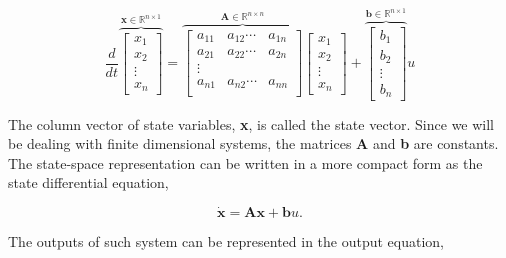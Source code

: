 \begin{displaymath}
\frac{d}{dt}\overbrace{\left[ \begin{array}{c}
                    x_{1}\\
                    x_{2}\\
                    \vdots\\
                    x_{n}
                    \end{array}\right]}^{\textbf{x}\in\mathbb{R}^{n\times1}}=
            \overbrace{\left[\begin{array}{ccc}
                    a_{11}&a_{12}\cdots&a_{1n}\\
                    a_{21}&a_{22}\cdots&a_{2n}\\
                    \vdots\\
                    a_{n1}&a_{n2}\cdots&a_{nn}\\
                    \end{array}\right]}^{\textbf{A}\in\mathbb{R}^{n\times n}}
            \left[ \begin{array}{c}
                    x_{1}\\
                    x_{2}\\
                    \vdots\\
                    x_{n}
                    \end{array}\right]+
            \overbrace{\left[ \begin{array}{c}
                                b_{1}\\
                                b_{2}\\
                                \vdots\\
                                b_{n}
                                \end{array}\right]}^{\textbf{b}\in\mathbb{R}^{n\times1}}u
\end{displaymath}

\medskip The column vector of state variables, \textbf{x}, is called
the state vector.  Since we will be dealing with finite
dimensional systems, the matrices \textbf {A} and \textbf {b} are
constants. The state-space representation can be written in a more
compact form as the state differential equation,

\begin{equation}
\mathbf {\dot x}=\mathbf{Ax}+\mathbf{b}u. \label{eq:statedeq}
\end{equation}

\noindent The outputs of such system can be represented in the
output equation,

